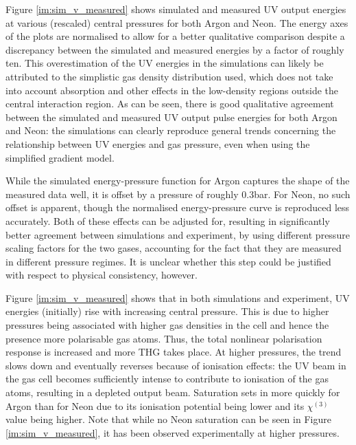 \documentclass[a4paper]{jpconf}
\begin{document}
Figure \ref{im:sim_v_measured} shows simulated and measured UV output energies at various (rescaled) central pressures for both Argon and Neon. The energy axes of the plots are normalised to allow for a better qualitative comparison despite a discrepancy between the simulated and measured energies by a factor of roughly ten. This overestimation of the UV energies in the simulations can likely be attributed to the simplistic gas density distribution used, which does not take into account absorption and other effects in the low-density regions outside the central interaction region. As can be seen, there is good qualitative agreement between the simulated and measured UV output pulse energies for both Argon and Neon: the simulations can clearly reproduce general trends concerning the relationship between UV energies and gas pressure, even when using the simplified gradient model. \par 
While the simulated energy-pressure function for Argon captures the shape of the measured data well, it is offset by a pressure of roughly 0.3bar. For Neon, no such offset is apparent, though the normalised energy-pressure curve is reproduced less accurately.   Both of these effects can be adjusted for, resulting in significantly better agreement between simulations and experiment, by using different pressure scaling factors for the two gases, accounting for the fact that they are measured in different pressure regimes. It is unclear whether this step could be justified with respect to physical consistency, however. \par 
Figure \ref{im:sim_v_measured} shows that in both simulations and experiment, UV energies (initially) rise with increasing central pressure. This is due to higher pressures being associated with higher gas densities in the cell and hence the presence more polarisable gas atoms. Thus, the total nonlinear polarisation response is increased and more THG takes place. At higher pressures, the trend slows down and eventually reverses because of ionisation effects: the UV beam in the gas cell becomes sufficiently intense to contribute to ionisation of the gas atoms, resulting in a depleted output beam. Saturation sets in more quickly for Argon than for Neon due to its ionisation potential being lower and its $\chi^{(3)}$ value being higher. Note that while no Neon saturation can be seen in Figure \ref{im:sim_v_measured}, it has been observed experimentally at higher pressures.  \par 
\end{document}
